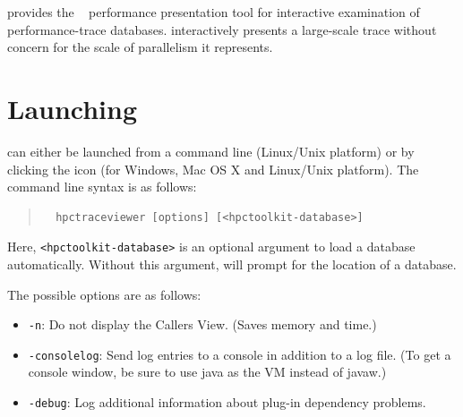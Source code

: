 

\HPCToolkit{} provides the \hpctraceviewer{}~\cite{Tallent-MC-etal:2011:hpctoolkit-scalable-tracing} performance presentation tool for interactive examination of performance-trace databases.
\hpctraceviewer{} interactively presents a large-scale trace without concern for the scale of parallelism it represents.



\section{Launching}

\hpctraceviewer{} can either be launched from a command line (Linux/Unix platform) or by clicking the \hpctraceviewer{} icon (for Windows, Mac OS X and Linux/Unix platform).
The command line syntax is as follows:
\begin{quote}
\begin{verbatim}
  hpctraceviewer [options] [<hpctoolkit-database>]
\end{verbatim}
\end{quote}
Here, \texttt{<hpctoolkit-database>} is an optional argument to load a database automatically.
Without this argument, \hpctraceviewer{} will prompt for the location of a database.

The possible options are as follows:
\begin{itemize}
 \item \texttt{-n}: Do not display the Callers View.  (Saves memory and time.)

 \item \texttt{-consolelog}: Send log entries to a console in addition to a log file.
   (To get a console window, be sure to use java as the VM instead of javaw.)

 \item \texttt{-debug}: Log additional information about plug-in dependency problems.
\end{itemize}



